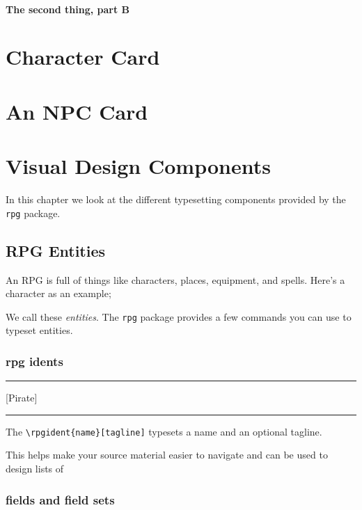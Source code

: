 \lipsum[5]

\subsubsection{The second thing, part B}

\lipsum[6-9]

\chapter{Character Card}



\chapter{An NPC Card}



\chapter{Visual Design Components}

In this chapter we look at the different typesetting components provided by the \texttt{rpg} package.

\section{RPG Entities}

An RPG is full of things like characters, places, equipment, and spells. Here's a character as an example;

\rpgdoublevskip

\rpgdoublevskip

We call these \emph{entities}. The \texttt{rpg} package provides a few commands you can use to typeset entities.

\subsection{rpg idents}

\rpgvskip
\hrule
\rpgvskip
{}[Pirate]
\rpgdoublevskip
\hrule
\rpgvskip

The \verb|\rpgident{name}[tagline]| typesets a name and an optional tagline.

This helps make your source material easier to navigate and can be used to design lists of

\subsection{fields and field sets}

